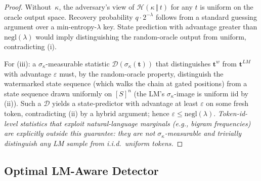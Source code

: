 \begin{proof}
  Without~$\kappa$, the adversary's view of $\mathcal{H}(\kappa \,\Vert\, t)$
  for any $t$ is uniform on the oracle output space.  Recovery
  probability $q \cdot 2^{-\lambda}$ follows from a standard
  guessing argument over a min-entropy-$\lambda$ key.  State
  prediction with advantage greater than $\mathrm{negl}(\lambda)$
  would imply distinguishing the random-oracle output from uniform,
  contradicting (i).

  For (iii): a $\sigma_\kappa$-measurable statistic
  $\mathcal{D}(\sigma_\kappa(\mathbf{t}))$ that distinguishes
  $\mathbf{t}^w$ from $\mathbf{t}^{LM}$ with advantage $\varepsilon$
  must, by the random-oracle property, distinguish the watermarked
  state sequence (which walks the chain at gated positions) from
  a state sequence drawn uniformly on $[S]^n$ (the LM's
  $\sigma_\kappa$-image is uniform iid by (ii)).  Such a
  $\mathcal{D}$ yields a state-predictor with advantage at least
  $\varepsilon$ on some fresh token, contradicting (ii) by a hybrid
  argument; hence $\varepsilon \leq \mathrm{negl}(\lambda)$.
  \emph{Token-id-level statistics that exploit natural-language
  marginals (e.g., bigram frequencies) are explicitly outside this
  guarantee: they are not $\sigma_\kappa$-measurable and trivially
  distinguish any LM sample from i.i.d.\ uniform tokens.}
\end{proof}


\subsection{Optimal LM-Aware Detector}
\label{subsec:proof-hdd}

